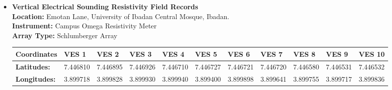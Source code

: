 \documentclass[12pt,a4paper]{report}
\begin{document}
\begin{itemize}
    \item \textbf{Vertical Electrical Sounding Resistivity Field Records} \\

    \textbf{Location:} {Emotan Lane, University of Ibadan Central Mosque, Ibadan.} \\
    \textbf{Instrument:} {Campus Omega Resistivity Meter} \\
    \textbf{Array Type:} {Schlumberger Array }

    \begin{table}[H]
        \centering
        \begin{adjustbox}{max width=\textwidth}
        \renewcommand{\arraystretch}{1.5}
        \begin{tabular}{|p{2.5cm}|p{1.5cm}|p{1.8cm}|p{1.5cm}|p{1.8cm}|p{1.5cm}|p{1.8cm}|p{1.5cm}|p{1.8cm}|p{1.5cm}|p{1.8cm}|}
        \hline
        \textbf{Coordinates} &  
        \textbf{VES 1} & 
        \textbf{VES 2} & 
        \textbf{VES 3} & 
        \textbf{VES 4} & 
        \textbf{VES 5} & 
        \textbf{VES 6} & 
        \textbf{VES 7} & 
        \textbf{VES 8} & 
        \textbf{VES 9} & 
        \textbf{VES 10} \\ 
        \hline
        \textbf{Latitudes:} & 7.446810 & 7.446895 & 7.446926 & 7.446710 & 7.446727 & 7.446721 & 7.446720 & 7.446580 & 7.446531 & 7.446532 \\ \hline
        \textbf{Longitudes:} & 3.899718 & 3.899828 & 3.899930 & 3.899940 & 3.899400 & 3.899898 & 3.899641 & 3.899755 & 3.899717 & 3.899836 \\ \hline
        \end{tabular}
        \end{adjustbox}
        \label{tab:UI Mosque VES Coordinates: 1-0}
    \end{table}


\end{itemize}
\end{document}
